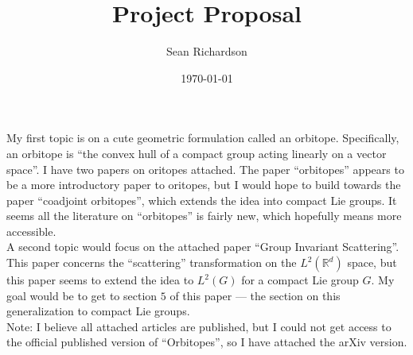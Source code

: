 \documentclass[12]{amsart}
\begin{document}
\title{Project Proposal}
\author{Sean Richardson}
\date{\today}
\maketitle

My first topic is on a cute geometric formulation called an orbitope.
Specifically, an orbitope is ``the convex hull of a compact group acting
linearly on a vector space''. I have two papers on oritopes attached. The paper
``orbitopes'' appears to be a more introductory paper to oritopes, but I would
hope to build towards the paper ``coadjoint orbitopes'', which extends the
idea into compact Lie groups. It seems all the literature on ``orbitopes'' is
fairly new, which hopefully means more accessible.\\


A second topic would focus on the attached paper ``Group Invariant Scattering''. This paper concerns the ``scattering'' transformation on the $L^2(\mathbb{R}^d)$ space, but this paper seems to extend the idea to $L^2(G)$ for a compact Lie group $G$. My goal would be to get to section $5$ of this paper --- the section on this generalization to compact Lie groups.\\

Note: I believe all attached articles are published, but I could not get access to the official published version of ``Orbitopes'', so I have attached the arXiv version.
\end{document}
